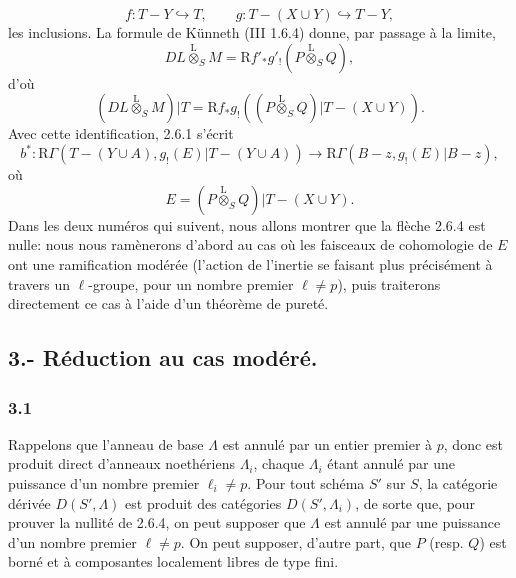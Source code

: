 \documentclass[11pt]{article}
\newcommand{\R}{\mathrm{R}}\newcommand{\RHomCore}{\mathrm{RHom}}
\providecommand{\lten}{\overset{\mathrm L}{\otimes}}
\providecommand{\lten}{\overset{\mathrm L}{\otimes}}
\providecommand{\lten}{\overset{\mathrm L}{\otimes}}
\providecommand{\R}{\mathrm R}
\providecommand{\lten}{\overset{\mathrm L}{\otimes}}
\providecommand{\lten}{\overset{\mathrm L}{\otimes}}
\providecommand{\lten}{\overset{\mathrm L}{\otimes}}
\providecommand{\lten}{\overset{\mathrm L}{\otimes}}
\begin{document}
\[
f:T-Y\hookrightarrow T,\qquad
g:T-(X\cup Y)\hookrightarrow T-Y,
\]
les inclusions. La formule de Künneth (III 1.6.4) donne, par passage à la limite,
\[
DL\lten_SM=\R f'_*g'_!(P\lten_SQ),
\]
d'où
\begin{equation}
(DL\lten_SM)|T=\R f_*g_!((P\lten_SQ)|T-(X\cup Y)).
\tag{2.6.3}
\end{equation}
Avec cette identification, 2.6.1 s'écrit
\begin{equation}
b^*:\R\Gamma(T-(Y\cup A),g_!(E)|T-(Y\cup A))
 \longrightarrow \R\Gamma(B-z,g_!(E)|B-z),
\tag{2.6.4}
\end{equation}
où
\[
E=(P\lten_SQ)|T-(X\cup Y).
\]
Dans les deux numéros qui suivent, nous allons montrer que la flèche 2.6.4 est nulle: nous nous ramènerons d'abord au cas où les faisceaux de cohomologie de $E$ ont une ramification modérée (l'action de l'inertie se faisant plus précisément à travers un $\ell$-groupe, pour un nombre premier $\ell\ne p$), puis traiterons directement ce cas à l'aide d'un théorème de pureté.

\subsection*{3.- Réduction au cas modéré.}

\subsubsection*{3.1}
Rappelons que l'anneau de base $\Lambda$ est annulé par un entier premier à $p$, donc est produit direct d'anneaux noethériens $\Lambda_i$, chaque $\Lambda_i$ étant annulé par une puissance d'un nombre premier $\ell_i\ne p$. Pour tout schéma $S'$ sur $S$, la catégorie dérivée $D(S',\Lambda)$ est produit des catégories $D(S',\Lambda_i)$, de sorte que, pour prouver la nullité de 2.6.4, on peut supposer que $\Lambda$ est annulé par une puissance d'un nombre premier $\ell\ne p$. On peut supposer, d'autre part, que $P$ (resp. $Q$) est borné et à composantes localement libres de type fini.
\end{document}
